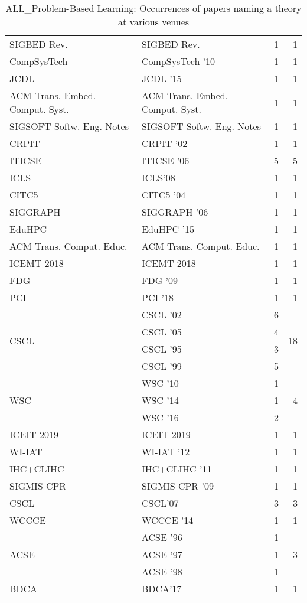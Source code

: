 \begin{table*}[t]
\begin{tabular}{llrr}
\multirow{1}{*}{SIGBED Rev.} & SIGBED Rev. & 1 & \multirow{1}{*}{1}\\
\multirow{1}{*}{CompSysTech } & CompSysTech '10 & 1 & \multirow{1}{*}{1}\\
\multirow{1}{*}{JCDL } & JCDL '15 & 1 & \multirow{1}{*}{1}\\
\multirow{1}{*}{ACM Trans. Embed. Comput. Syst.} & ACM Trans. Embed. Comput. Syst. & 1 & \multirow{1}{*}{1}\\
\multirow{1}{*}{SIGSOFT Softw. Eng. Notes} & SIGSOFT Softw. Eng. Notes & 1 & \multirow{1}{*}{1}\\
\multirow{1}{*}{CRPIT } & CRPIT '02 & 1 & \multirow{1}{*}{1}\\
\multirow{1}{*}{ITICSE } & ITICSE '06 & 5 & \multirow{1}{*}{5}\\
\multirow{1}{*}{ICLS} & ICLS'08 & 1 & \multirow{1}{*}{1}\\
\multirow{1}{*}{CITC5 } & CITC5 '04 & 1 & \multirow{1}{*}{1}\\
\multirow{1}{*}{SIGGRAPH } & SIGGRAPH '06 & 1 & \multirow{1}{*}{1}\\
\multirow{1}{*}{EduHPC } & EduHPC '15 & 1 & \multirow{1}{*}{1}\\
\multirow{1}{*}{ACM Trans. Comput. Educ.} & ACM Trans. Comput. Educ. & 1 & \multirow{1}{*}{1}\\
\multirow{1}{*}{ICEMT 2018} & ICEMT 2018 & 1 & \multirow{1}{*}{1}\\
\multirow{1}{*}{FDG } & FDG '09 & 1 & \multirow{1}{*}{1}\\
\multirow{1}{*}{PCI } & PCI '18 & 1 & \multirow{1}{*}{1}\\
\multirow{4}{*}{CSCL } & CSCL '02 & 6 & \multirow{4}{*}{18}\\
& CSCL '05 & 4 &\\
& CSCL '95 & 3 &\\
& CSCL '99 & 5 &\\
\multirow{3}{*}{WSC } & WSC '10 & 1 & \multirow{3}{*}{4}\\
& WSC '14 & 1 &\\
& WSC '16 & 2 &\\
\multirow{1}{*}{ICEIT 2019} & ICEIT 2019 & 1 & \multirow{1}{*}{1}\\
\multirow{1}{*}{WI-IAT } & WI-IAT '12 & 1 & \multirow{1}{*}{1}\\
\multirow{1}{*}{IHC+CLIHC } & IHC+CLIHC '11 & 1 & \multirow{1}{*}{1}\\
\multirow{1}{*}{SIGMIS CPR } & SIGMIS CPR '09 & 1 & \multirow{1}{*}{1}\\
\multirow{1}{*}{CSCL} & CSCL'07 & 3 & \multirow{1}{*}{3}\\
\multirow{1}{*}{WCCCE } & WCCCE '14 & 1 & \multirow{1}{*}{1}\\
\multirow{3}{*}{ACSE } & ACSE '96 & 1 & \multirow{3}{*}{3}\\
& ACSE '97 & 1 &\\
& ACSE '98 & 1 &\\
\multirow{1}{*}{BDCA} & BDCA'17 & 1 & \multirow{1}{*}{1}\\
\end{tabular}
\caption{ALL\_Problem-Based Learning: Occurrences of papers naming a theory at various venues}
\end{table*}